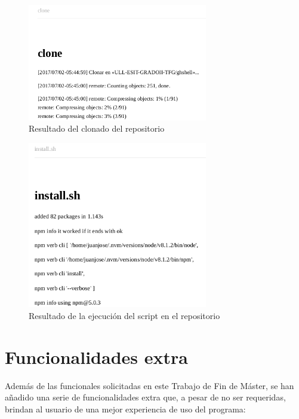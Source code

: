 		\begin{figure}[H]
		\begin{center}
		\includegraphics[width=0.7\textwidth]{images/ghshell8-8}
		\caption{Resultado del clonado del repositorio}
		\label{fig:ghshell8-8}
		\end{center}
		\end{figure}
		
		\begin{figure}[H]
		\begin{center}
		\includegraphics[width=0.7\textwidth]{images/ghshell8-9}
		\caption{Resultado de la ejecución del script en el repositorio}
		\label{fig:ghshell8-9}
		\end{center}
		\end{figure}        		
  		
\newpage
\section{Funcionalidades extra}
\label{3:sec:2}

Además de las funcionales solicitadas en este Trabajo de Fin de Máster, se han añadido una serie de funcionalidades extra que, a pesar de no ser requeridas, brindan al usuario de una mejor experiencia de uso del programa:

